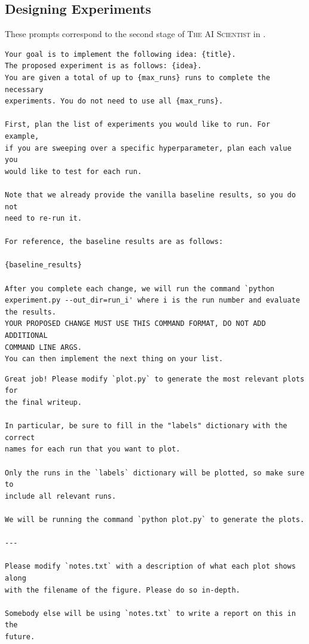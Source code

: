 \documentclass[11pt, a4paper]{include/gdm_format}
\newcommand{\ouralgo}{\textsc{The AI Scientist}\xspace}
\begin{document}
\subsection{Designing Experiments}
\label{appsubsec:experiment_prompts}

These prompts correspond to the second stage of \ouralgo in .

\begin{tcolorbox}[breakable, colback=orange!5!white, colframe=orange!80!black, title=Experiment Running Aider Prompt]
\small
\begin{verbatim}
Your goal is to implement the following idea: {title}.
The proposed experiment is as follows: {idea}.
You are given a total of up to {max_runs} runs to complete the necessary
experiments. You do not need to use all {max_runs}.

First, plan the list of experiments you would like to run. For example,
if you are sweeping over a specific hyperparameter, plan each value you
would like to test for each run.

Note that we already provide the vanilla baseline results, so you do not
need to re-run it.

For reference, the baseline results are as follows:

{baseline_results}

After you complete each change, we will run the command `python 
experiment.py --out_dir=run_i' where i is the run number and evaluate 
the results.
YOUR PROPOSED CHANGE MUST USE THIS COMMAND FORMAT, DO NOT ADD ADDITIONAL 
COMMAND LINE ARGS.
You can then implement the next thing on your list.
\end{verbatim}
\end{tcolorbox}

\begin{tcolorbox}[breakable, colback=orange!5!white, colframe=orange!80!black, title=Plotting Aider Prompt]
\small
\begin{verbatim}
Great job! Please modify `plot.py` to generate the most relevant plots for
the final writeup. 

In particular, be sure to fill in the "labels" dictionary with the correct
names for each run that you want to plot.

Only the runs in the `labels` dictionary will be plotted, so make sure to
include all relevant runs.

We will be running the command `python plot.py` to generate the plots.

---

Please modify `notes.txt` with a description of what each plot shows along
with the filename of the figure. Please do so in-depth.

Somebody else will be using `notes.txt` to write a report on this in the
future.
\end{verbatim}
\end{tcolorbox}
\end{document}
